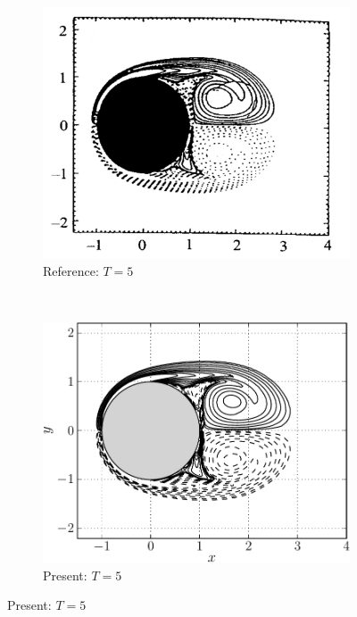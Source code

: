 \begin{figure}[p]
     
     \begin{subfigure}[t]{0.45\textwidth}
             \includegraphics[height=0.2\textheight]{figures/eulerian/ISC_vorticityContours_t5_ref-mod.png}
             \caption{Reference: $T=5$}
             \label{fig:ISC_vorticityContours_t5_ref}
     \end{subfigure}%
     ~ %
     \begin{subfigure}[t]{0.45\textwidth}
             \includegraphics[height=0.2\textheight]{figures/eulerian/ISC_vorticityContours_t5_fliped-crop.pdf}
             \caption{Present: $T=5$}
             \label{fig:ISC_vorticityContours_t5-crop}
     \end{subfigure}
     

\end{figure}
